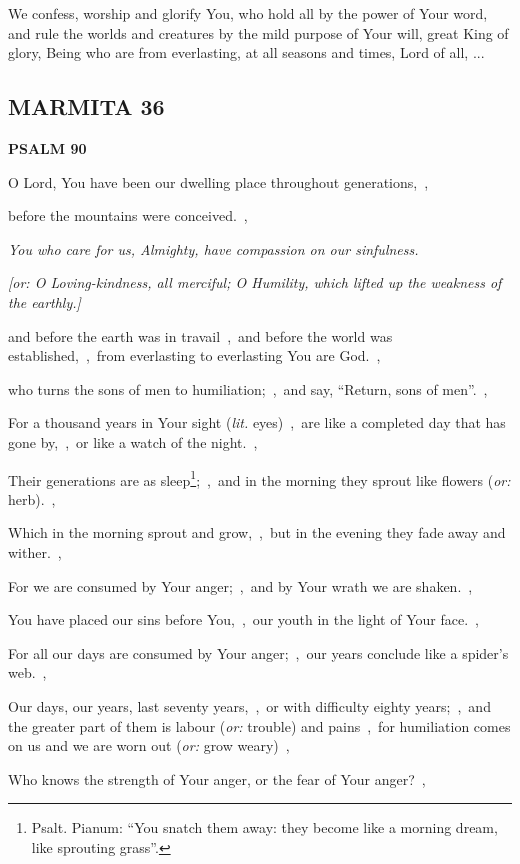 \documentclass[12pt,twoside,a5paper]{article}
\newcommand{\marmita}[1]{\subsection*{MARMITA {#1}}}
\newcommand{\psalm}[1]{\textbf{PSALM {#1}}\nopagebreak}
\newcommand{\qanona}[1]{{\liturgicalhint{Qanona.} \emph{#1}}}
\newcommand{\slota}[1]{\liturgicalhint{Slota.} #1}
\newcommand{\translationoption}[1]{\emph{or:} #1}
\newcommand{\translationliteral}[1]{\emph{lit.} #1}
\begin{document}
\slota{We confess, worship and glorify You, who hold all by the power of Your word, and rule the worlds and creatures by the mild purpose of Your will, great King of glory, Being who are from everlasting, at all seasons and times, Lord of all, ...}

\marmita{36}

\psalm{90}

\begin{normalparskip}
  O Lord, You have been our dwelling place throughout generations,~\sep

  before the mountains were conceived.~\sep

  \qanona{You who care for us, Almighty, have compassion on our sinfulness.}

  \emph{[\translationoption{O Loving-kindness, all merciful; O Humility, which lifted up the weakness of the earthly.}]}

  and before the earth was in travail~\sep\ and before the world was established,~\sep\ from everlasting to everlasting You are God.~\sep

  who turns the sons of men to humiliation;~\sep\ and say, ``Return, sons of men''.~\sep

  For a thousand years in Your sight (\translationliteral{eyes})~\sep\ are like a completed day that has gone by,~\sep\ or like a watch of the night.~\sep

  Their generations are as sleep\footnote{Psalt. Pianum: ``You snatch them away: they become like a morning dream, like sprouting grass''.};~\sep\ and in the morning they sprout like flowers (\translationoption{herb}).~\sep

  Which in the morning sprout and grow,~\sep\ but in the evening they fade away and wither.~\sep

  For we are consumed by Your anger;~\sep\ and by Your wrath we are shaken.~\sep

  You have placed our sins before You,~\sep\ our youth in the light of Your face.~\sep

  For all our days are consumed by Your anger;~\sep\ our years conclude like a spider's web.~\sep

  Our days, our years, last seventy years,~\sep\ or with difficulty eighty years;~\sep\ and the greater part of them is labour (\translationoption{trouble}) and pains~\sep\ for humiliation comes on us and we are worn out (\translationoption{grow weary})~\sep

  Who knows the strength of Your anger, or the fear of Your anger?~\sep


\end{normalparskip}
\end{document}
